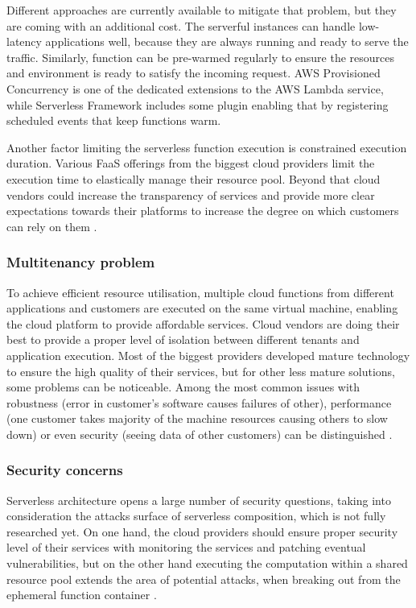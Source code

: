 Different approaches are currently available to mitigate that problem, but they are coming with an additional cost. The serverful instances can handle low-latency applications well, because they are always running and ready to serve the traffic. Similarly, function can be pre-warmed regularly to ensure the resources and environment is ready to satisfy the incoming request. AWS Provisioned Concurrency is one of the dedicated extensions to the AWS Lambda service, while Serverless Framework includes some plugin enabling that by registering scheduled events that keep functions warm.

Another factor limiting the serverless function execution is constrained execution duration. Various FaaS offerings from the biggest cloud providers limit the execution time to elastically manage their resource pool. Beyond that cloud vendors could increase the transparency of services and provide more clear expectations towards their platforms to increase the degree on which customers can rely on them \cite{MartinFowlerServerless}.

\subsubsection*{Multitenancy problem}

To achieve efficient resource utilisation, multiple cloud functions from different applications and customers are executed on the same virtual machine, enabling the cloud platform to provide affordable services. Cloud vendors are doing their best to provide a proper level of isolation between different tenants and application execution. Most of the biggest providers developed mature technology to ensure the high quality of their services, but for other less mature solutions, some problems can be noticeable. Among the most common issues with robustness (error in customer’s software causes failures of other), performance (one customer takes majority of the machine resources causing others to slow down) or even security (seeing data of other customers) can be distinguished \cite{MartinFowlerServerless}.

\subsubsection*{Security concerns}

Serverless architecture opens a large number of security questions, taking into consideration the attacks surface of serverless composition, which is not fully researched yet. On one hand, the cloud providers should ensure proper security level of their services with monitoring the services and patching eventual vulnerabilities, but on the other hand executing the computation within a shared resource pool extends the area of potential attacks, when breaking out from the ephemeral function container \cite{LeveragingServerlessCloudComputingArchitectures}.

